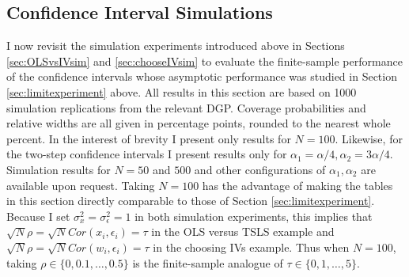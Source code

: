 \subsection{Confidence Interval Simulations}
\label{sec:CIsim}
I now revisit the simulation experiments introduced above in Sections \ref{sec:OLSvsIVsim} and \ref{sec:chooseIVsim} to evaluate the finite-sample performance of the confidence intervals whose asymptotic performance was studied in Section \ref{sec:limitexperiment} above.
All results in this section are based on 1000 simulation replications from the relevant DGP.
Coverage probabilities and relative widths are all given in percentage points, rounded to the nearest whole percent.
In the interest of brevity I present only results for $N=100$.
Likewise, for the two-step confidence intervals I present results only for $\alpha_1 = \alpha/4, \alpha_2 = 3\alpha/4$.
Simulation results for $N=50$ and $500$ and other configurations of $\alpha_1,\alpha_2$ are available upon request.
Taking $N=100$ has the advantage of making the tables in this section directly comparable to those of Section \ref{sec:limitexperiment}.
Because I set $\sigma_x^2 = \sigma_\epsilon^2 = 1$ in both simulation experiments, this implies that $\sqrt{N}\rho = \sqrt{N} Cor(x_i,\epsilon_i) = \tau$ in the OLS versus TSLS example and $\sqrt{N}\rho = \sqrt{N} Cor(w_i, \epsilon_i) = \tau$ in the choosing IVs example. 
Thus when $N = 100$, taking $\rho \in \{0, 0.1, \dots, 0.5\}$ is the finite-sample analogue of $\tau \in \{0, 1, \dots, 5\}$.

